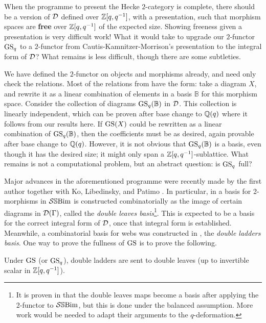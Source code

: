 When the programme to present the Hecke $2$-category is complete, there should be a version of $\mathcal{D}$ defined over $\mathbb{Z}[q,q^{-1}]$, with a presentation, such that morphism spaces are \textbf{free} over $\mathbb{Z}[q,q^{-1}]$ of the expected size. Showing freeness given a presentation is very difficult work! What it would take to upgrade our $2$-functor $\operatorname{GS}_q$ to a $2$-functor from Cautis-Kamnitzer-Morrison's presentation to the integral form of $\mathcal{D}$? What remains is less difficult, though there are some subtleties.

We have defined the $2$-functor on objects and morphisms already, and need only check the relations. Most of the relations from \cite{CKM} have the form: take a diagram $X$, and rewrite it as a linear combination of elements in a basis $\mathbb{B}$ for this morphism space. Consider the collection of diagrams $\operatorname{GS}_q(\mathbb{B})$ in $\mathcal{D}$. This collection is linearly independent, which can be proven after base change to $\mathbb{Q}(q)$ where it follows from our results here. If $\operatorname{GS}(X)$ could be rewritten as a linear combination of $\operatorname{GS}_q(\mathbb{B})$, then the coefficients must be as desired, again provable after base change to $\mathbb{Q}(q)$. However, it is not obvious that $\operatorname{GS}_q(\mathbb{B})$ is a basis, even though it has the desired size; it might only span a $\mathbb{Z}[q,q^{-1}]$-sublattice. What remains is not a computational problem, but an abstract question: is $\operatorname{GS}_q$ full?

Major advances in the aforementioned programme were recently made by the first author together with Ko, Libedinsky, and Patimo \cite{EKo, KELPDemazure, KELPBruhat, KELPLeibniz, EKLP}. In particular, in \cite{EKLP} a basis for 2-morphisms in $\mathcal{S}\mathbb{S}\text{Bim}$ is constructed combinatorially as the image of certain diagrams in $\mathcal{D}(\Gamma)$, called the \emph{double leaves basis}\footnote{It is proven in \cite{EKLP} that the double leaves maps become a basis after applying the 2-functor to $\mathcal{S}\mathbb{S}\text{Bim}$, but this is done under the balanced assumption. More work would be needed to adapt their arguments to the $q$-deformation.}. This is expected to be a basis for the correct integral form of $\mathcal{D}$, once that integral form is established. Meanwhile, a combinatorial basis for webs was constructed in \cite{ELLCC}, the \emph{double ladders basis}. One way to prove the fullness of $\operatorname{GS}$ is to prove the following.

\begin{conjecture} \label{conj:double} Under $\operatorname{GS}$ (or $\operatorname{GS}_q$), double ladders are sent to double leaves (up to invertible scalar in $\mathbb{Z}[q,q^{-1}]$). \end{conjecture}

